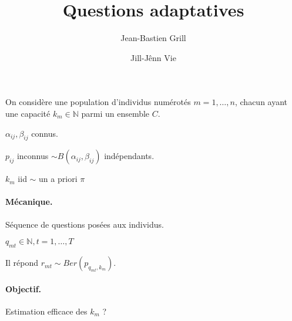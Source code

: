 \documentclass[a4paper,12pt]{article}
\title{Questions adaptatives}
\author{Jean-Bastien Grill \and Jill-Jênn Vie}
\def\N{\mathbb{N}}
\begin{document}
\maketitle

On considère une population d'individus numérotés $m = 1, \ldots, n$, chacun ayant une capacité $k_m \in \N$ parmi un ensemble $C$.

$\alpha_{ij}, \beta_{ij}$ connus.

$p_{ij}$ inconnus $\sim B(\alpha_{ij}, \beta_{ij})$ indépendants.

$k_m$ iid $\sim$ un a priori $\pi$

\paragraph{Mécanique.} Séquence de questions posées aux individus.

$q_{mt} \in \N, t = 1, \ldots, T$

Il répond $r_{mt} \sim Ber(p_{q_{mt}, k_m})$.

\paragraph{Objectif.} Estimation efficace des $k_m$ ?
\end{document}

